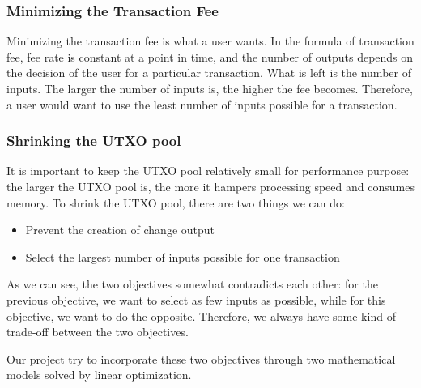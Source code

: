       \subsubsection{Minimizing the Transaction Fee}
        \par Minimizing the transaction fee is what a user wants. In the formula of transaction fee, fee rate is constant at a point in time, and the number of outputs depends on the decision of the user for a particular transaction. What is left is the number of inputs. The larger the number of inputs is, the higher the fee becomes. Therefore, a user would want to use the least number of inputs possible for a transaction.

      \subsubsection{Shrinking the UTXO pool}
        \par It is important to keep the UTXO pool relatively small for performance purpose: the larger the UTXO pool is, the more it hampers processing speed and consumes memory. To shrink the UTXO pool, there are two things we can do:

        \begin{itemize}
          \item Prevent the creation of change output
          \item Select the largest number of inputs possible for one transaction
        \end{itemize}

        \par As we can see, the two objectives somewhat contradicts each other: for the previous objective, we want to select as few inputs as possible, while for this objective, we want to do the opposite. Therefore, we always have some kind of trade-off between the two objectives.

        \par Our project try to incorporate these two objectives through two mathematical models solved by linear optimization.

\clearpage
